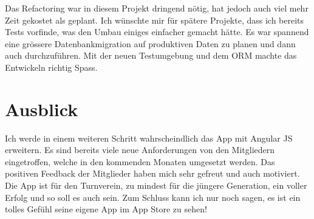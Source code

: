 Das Refactoring war in diesem Projekt dringend nötig, hat jedoch auch viel mehr Zeit gekostet als geplant. Ich wünschte mir für spätere Projekte, dass ich bereits Tests vorfinde, was den Umbau einiges einfacher gemacht hätte. Es war spannend eine grössere Datenbankmigration auf produktiven Daten zu planen und dann auch durchzuführen. Mit der neuen Testumgebung und dem ORM machte das Entwickeln richtig Spass.\\

\section{Ausblick}\label{fazit_ausblick}
Ich werde in einem weiteren Schritt wahrscheindlich das App mit Angular JS erweitern. Es sind bereits viele neue Anforderungen von den Mitgliedern eingetroffen, welche in den kommenden Monaten umgesetzt werden. Das positiven Feedback der Mitglieder haben mich sehr gefreut und auch motiviert. Die App ist für den Turnverein, zu mindest für die jüngere Generation, ein voller Erfolg und so soll es auch sein. Zum Schluss kann ich nur noch sagen, es ist ein tolles Gefühl seine eigene App im App Store zu sehen!